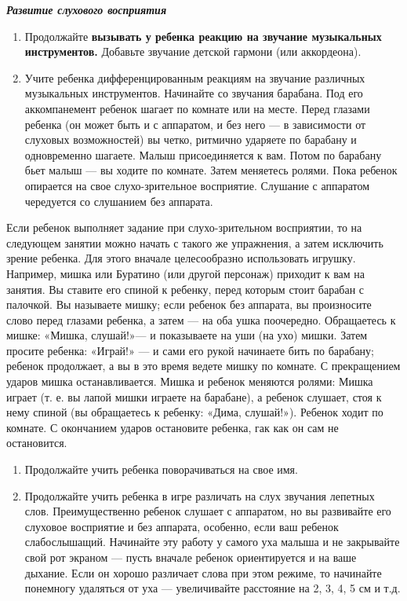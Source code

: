 \documentclass{book}
\renewcommand{\emph}[1]{\textit{#1}}
\begin{document}
\emph{\textbf{Развитие слухового восприятия}}


\begin{enumerate}
\def\labelenumi{\arabic{enumi}.}
\item
  
  Продолжайте \textbf{вызывать у ребенка реакцию на звучание музыкальных
  инструментов.} Добавьте звучание детской гармони (или аккордеона).
  
\item
  
  Учите ребенка дифференцированным реакциям на звучание различных
  музыкальных инструментов. Начинайте со звучания барабана. Под его
  аккомпанемент ребенок шагает по комнате или на месте. Перед глазами
  ребенка (он может быть и с аппаратом, и без него --- в зависимости от
  слуховых возможностей) вы четко, ритмично ударяете по барабану и
  одновременно шагаете. Малыш присоединяется к вам. Потом по барабану
  бьет малыш --- вы ходите по комнате. Затем меняетесь ролями. Пока
  ребенок опирается на свое слухо-зрительное восприятие. Слушание с
  аппаратом чередуется со слушанием без аппарата.
  
\end{enumerate}


Если ребенок выполняет задание при слухо-зрительном восприятии, то на
следующем занятии можно начать с такого же упражнения, а затем исключить
зрение ребенка. Для этого вначале целесообразно использовать игрушку.
Например, мишка или Буратино (или другой персонаж) приходит к вам на
занятия. Вы ставите его спиной к ребенку, перед которым стоит барабан с
палочкой. Вы называете мишку; если ребенок без аппарата, вы произносите
слово перед глазами ребенка, а затем --- на оба ушка поочередно.
Обращаетесь к мишке: «Мишка, слушай!»--- и показываете на уши (на ухо)
мишки. Затем просите ребенка: «Играй!» --- и сами его рукой начинаете
бить по барабану; ребенок продолжает, а вы в это время ведете мишку по
комнате. С прекращением ударов мишка останавливается. Мишка и ребенок
меняются ролями: Мишка играет (т. е. вы лапой мишки играете на
барабане), а ребенок слушает, стоя к нему спиной (вы обращаетесь к
ребенку: «Дима, слушай!»). Ребенок ходит по комнате. С окончанием ударов
остановите ребенка, гак как он сам не остановится.


\begin{enumerate}
\def\labelenumi{\arabic{enumi}.}
\setcounter{enumi}{2}
\item
  
  Продолжайте учить ребенка поворачиваться на свое имя.
  
\item
  
  Продолжайте учить ребенка в игре различать на слух звучания лепетных
  слов. Преимущественно ребенок слушает с аппаратом, но вы развивайте
  его слуховое восприятие и без аппарата, особенно, если ваш ребенок
  слабослышащий. Начинайте эту работу у самого уха малыша и не
  закрывайте свой рот экраном --- пусть вначале ребенок ориентируется и
  на ваше дыхание. Если он хорошо различает слова при этом режиме, то
  начинайте понемногу удаляться от уха --- увеличивайте расстояние на 2,
  3, 4, 5 см и т.д.
  
\end{enumerate}
\end{document}
